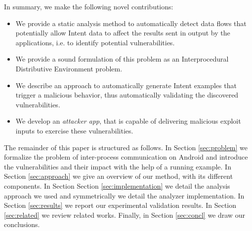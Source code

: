 In summary, we make the following novel contributions:
\begin{itemize}
 \item We provide a static analysis method to automatically detect data flows that potentially allow
 Intent data to affect the results sent in output by the applications, i.e. to identify potential vulnerabilities.
 \item We provide a sound formulation of this problem as an Interprocedural Distributive Environment problem.
 \item We describe an approach to automatically generate Intent examples that trigger a malicious behavior, thus
 automatically validating the discovered vulnerabilities.
 \item We develop an {\em attacker app}, that is capable of delivering malicious exploit inputs to exercise these vulnerabilities. 
\end{itemize}

The remainder of this paper is structured as follows. In Section \ref{sec:problem} we
formalize the problem of inter-process communication on Android and introduce the vulnerabilities
and their impact with the help of a running example. In Section \ref{sec:approach} we give an overview of our method, with its different components. In Section Section \ref{sec:implementation} we detail the analysis approach we used and symmetrically we detail the analyzer implementation. In Section \ref{sec:results}
we report our experimental validation results. In Section \ref{sec:related} we review  related works. Finally,
in Section \ref{sec:concl} we draw our conclusions.
